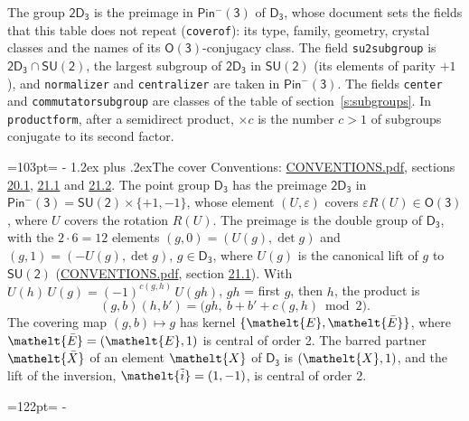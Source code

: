 \documentclass[10pt,a4paper]{article}
\makeatletter
\renewcommand\section{\@startsection{section}{1}{\z@}{-3ex plus -1ex minus -.2ex}%
  {1.2ex plus .2ex}{\normalfont\large\sffamily\bfseries\color{parttitle}}}
\newcommand{\needspace}[1]{\par\penalty-100\begingroup\dimen0=#1\relax\dimen2=\pagegoal
  \advance\dimen2-\pagetotal\ifdim\dimen0>\dimen2\relax\ifdim\dimen2>0pt\vfil\break\fi\fi
  \endgroup}
\numberwithin{equation}{section}
\newcommand{\eltfont}[1]{{\let\sigma\eltsigma\mathelt{#1}}}
\newcommand{\grp}[1]{\mathsf{#1}}
\newcommand{\elt}[1]{\eltfont{#1}}
\newcommand{\dirprod}{\times}
\newcommand{\barred}[1]{\bar{#1}}
\newcommand{\lift}[1]{\tilde{#1}}
\makeatother
\begin{document}
\leavevmode\label{n:element.inversion}\label{n:group.preimage}The group $\grp{2D_{3}}$ is the preimage in $\grp{Pin^{-}(3)}$ of \href{../../../rotation/data/pdf/D3.pdf}{$\grp{D_{3}}$}, whose document sets the fields that this table does not repeat (\texttt{coverof}): its type, family, geometry, crystal classes and the names of its \href{../../../rotation/data/pdf/O3.pdf}{$\grp{O(3)}$}-conjugacy class. The field \texttt{su2subgroup} is $\grp{2D_{3}} \cap \grp{SU(2)}$, the largest subgroup of $\grp{2D_{3}}$ in $\grp{SU(2)}$ (its elements of parity $+1$), and \texttt{normalizer} and \texttt{centralizer} are taken in $\grp{Pin^{-}(3)}$. The fields \texttt{center} and \texttt{commutatorsubgroup} are classes of the table of section~\ref{s:subgroups}.
\leavevmode\label{n:index.conjugates.c}In \texttt{productform}, after a semidirect product, ${\times}c$ is the number $c > 1$ of subgroups conjugate to its second factor.
\needspace{103pt}
\section{The cover}\label{s:cover}
Conventions: \href{../../CONVENTIONS.pdf}{CONVENTIONS.pdf}, sections \href{../../CONVENTIONS.pdf\#conv.20.1}{20.1}, \href{../../CONVENTIONS.pdf\#conv.21.1}{21.1} and \href{../../CONVENTIONS.pdf\#conv.21.2}{21.2}.
\leavevmode\label{n:group.pin.minus}\label{n:group.su2}\label{n:local.pin.sign}\label{n:matrix.covered}\label{n:matrix.lift.su2}\label{n:index.bar}The point group $\grp{D_{3}}$ has the preimage $\grp{2D_{3}}$ in $\grp{Pin^{-}(3)} = \grp{SU(2)} \dirprod \{+1, -1\}$, whose element $(U, \varepsilon)$ covers $\varepsilon R(U) \in \grp{O(3)}$, where $U$ covers the rotation $R(U)$. The preimage is the double group of $\grp{D_{3}}$, with the $2 \cdot 6 = 12$ elements $(g, 0) = (U(g), \det g)$ and $(g, 1) = (-U(g), \det g)$, $g \in \grp{D_{3}}$, where $U(g)$ is the canonical lift of $g$ to $\grp{SU(2)}$ (\href{../../CONVENTIONS.pdf}{CONVENTIONS.pdf}, section \href{../../CONVENTIONS.pdf\#conv.21.1}{21.1}). \label{n:function.cocycle}With $U(h)\,U(g) = (-1)^{c(g,h)}\,U(gh)$, $gh$ = first $g$, then $h$, the product is
\begin{equation}\label{e:product}(g, b)(h, b') = \bigl(gh,\ b + b' + c(g, h) \bmod 2\bigr).\end{equation}
\leavevmode\label{n:mark.bar}The covering map $(g, b) \mapsto g$ has kernel $\{\elt{E}, \elt{\barred{E}}\}$, where $\elt{\barred{E}} = (\elt{E}, 1)$ is central of order 2. \label{n:element.named}\label{n:mark.lift}The barred partner $\elt{\barred{X}}$ of an element $\elt{X}$ of $\grp{D_{3}}$ is $(\elt{X}, 1)$, and the lift of the inversion, $\elt{\lift{i}} = (1, -1)$, is central of order 2.
\needspace{122pt}
\end{document}
